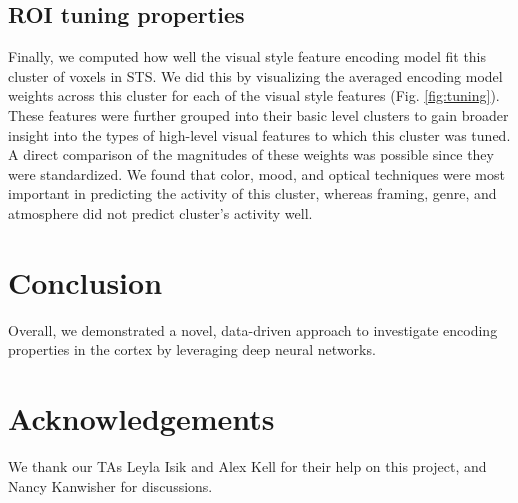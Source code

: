 \documentclass[10pt,twocolumn,letterpaper]{article}
\begin{document}
\subsection{ROI tuning properties}

Finally, we computed how well the visual style feature encoding model fit this cluster of voxels in STS. We did this by visualizing the averaged encoding model weights across this cluster for each of the visual style features (Fig. \ref{fig:tuning}). These features were further grouped into their basic level clusters to gain broader insight into the types of high-level visual features to which this cluster was tuned. A direct comparison of the magnitudes of these weights was possible since they were standardized. We found that color, mood, and optical techniques were most important in predicting the activity of this cluster, whereas framing, genre, and atmosphere did not predict cluster's activity well.



\section{Conclusion}

Overall, we demonstrated a novel, data-driven approach to investigate encoding properties in the cortex by leveraging deep neural networks.

\section{Acknowledgements}

We thank our TAs Leyla Isik and Alex Kell for their help on this project, and Nancy Kanwisher for discussions.


{\small


}
\end{document}
